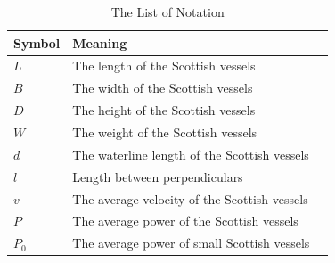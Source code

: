 \documentclass{mcmthesis}
\begin{document}
\begin{center}
\begin{longtable}{p{}p{}m{}}
\caption{The List of Notation}\\
\hline
Symbol& Meaning \\
\hline

$L$      & The length of the Scottish vessels \\
$B$      & The width of the Scottish vessels 
                                                          \\
$D$     & The height of the Scottish vessels 
                                                        \\
$W$     & The weight of the Scottish vessels 
                                                        \\
$d$      & The   waterline length of the Scottish vessels \\
$l$       & Length between perpendiculars                                                           \\
$v$      & The average velocity  of the Scottish vessels                                            \\
$P$      & The average power of the Scottish vessels\\
$P_0$      & The average power of small Scottish vessels\\    
                                     

\end{longtable}
\end{center}
\end{document}
